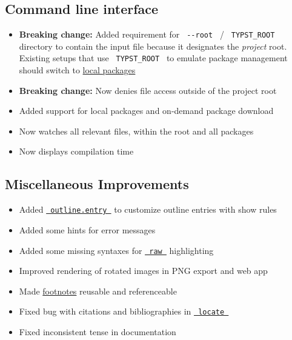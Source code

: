 \subsection{Command line interface}\label{command-line-interface}

\begin{itemize}
\tightlist
\item
  \textbf{Breaking change:} Added requirement for \texttt{\ -\/-root\ }
  / \texttt{\ TYPST\_ROOT\ } directory to contain the input file because
  it designates the \emph{project} root. Existing setups that use
  \texttt{\ TYPST\_ROOT\ } to emulate package management should switch
  to \href{https://github.com/typst/packages\#local-packages}{local
  packages}
\item
  \textbf{Breaking change:} Now denies file access outside of the
  project root
\item
  Added support for local packages and on-demand package download
\item
  Now watches all relevant files, within the root and all packages
\item
  Now displays compilation time
\end{itemize}

\subsection{Miscellaneous
Improvements}\label{miscellaneous-improvements}

\begin{itemize}
\tightlist
\item
  Added
  \href{/docs/reference/model/outline/\#definitions-entry}{\texttt{\ outline.entry\ }}
  to customize outline entries with show rules
\item
  Added some hints for error messages
\item
  Added some missing syntaxes for
  \href{/docs/reference/text/raw/}{\texttt{\ raw\ }} highlighting
\item
  Improved rendering of rotated images in PNG export and web app
\item
  Made \href{/docs/reference/model/footnote/}{footnotes} reusable and
  referenceable
\item
  Fixed bug with citations and bibliographies in
  \href{/docs/reference/introspection/locate/}{\texttt{\ locate\ }}
\item
  Fixed inconsistent tense in documentation
\end{itemize}

